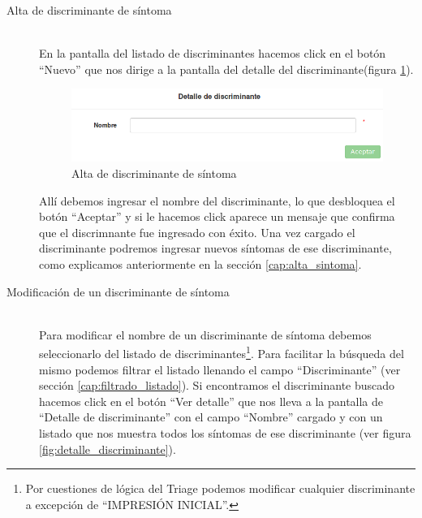 \begin{description}
\item[Alta de discriminante de síntoma] \mbox{} \\
En la pantalla del listado de discriminantes hacemos click en el botón ``Nuevo'' que nos dirige a la pantalla del detalle del discriminante(figura \ref{fig:nuevo_discriminante}).
\begin{figure}
\centerline{\includegraphics[width=1\textwidth]{nuevo_discriminante.png}}
\caption{Alta de discriminante de síntoma}
\label{fig:nuevo_discriminante}
\end{figure}
Allí debemos ingresar el nombre del discriminante, lo que desbloquea el botón ``Aceptar'' y si le hacemos click aparece un mensaje que confirma que el discrimnante fue ingresado con éxito. Una vez cargado el discriminante podremos ingresar nuevos síntomas de ese discriminante, como explicamos anteriormente en la sección \ref{cap:alta_sintoma}.
\item[Modificación de un discriminante de síntoma] \mbox{} \\
Para modificar el nombre de un discriminante de síntoma debemos seleccionarlo del listado de discriminantes\footnote{Por cuestiones de lógica del Triage podemos modificar cualquier discriminante a excepción de ``IMPRESIÓN INICIAL''.}. Para facilitar la búsqueda del mismo podemos filtrar el listado llenando el campo ``Discriminante'' (ver sección \ref{cap:filtrado_listado}). Si encontramos el discriminante buscado hacemos click en el botón ``Ver detalle'' que nos lleva a la pantalla de ``Detalle de discriminante'' con el campo ``Nombre'' cargado y con un listado que nos muestra todos los síntomas de ese discriminante (ver figura \ref{fig:detalle_discriminante}).
\begin{figure}

\end{figure}
\end{description}
